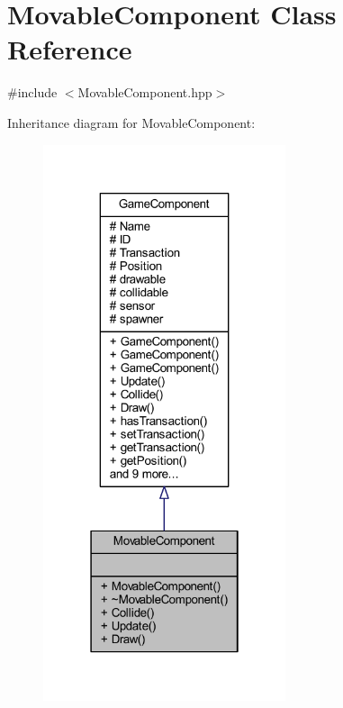 \hypertarget{class_movable_component}{\section{Movable\-Component Class Reference}
\label{class_movable_component}
}


{\ttfamily \#include $<$Movable\-Component.\-hpp$>$}



Inheritance diagram for Movable\-Component\-:\nopagebreak
\begin{figure}[H]
\begin{center}
\leavevmode
\includegraphics[width=202pt]{class_movable_component__inherit__graph}
\end{center}
\end{figure}



